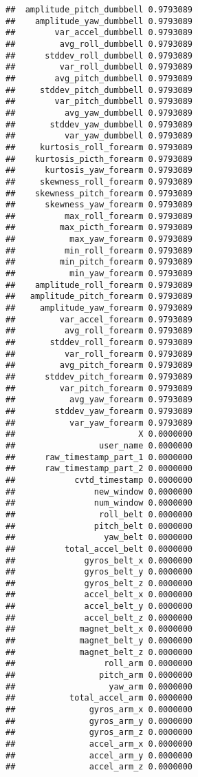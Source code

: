 \documentclass[]{article}
\begin{document}
\begin{verbatim}
##  amplitude_pitch_dumbbell 0.9793089
##    amplitude_yaw_dumbbell 0.9793089
##        var_accel_dumbbell 0.9793089
##         avg_roll_dumbbell 0.9793089
##      stddev_roll_dumbbell 0.9793089
##         var_roll_dumbbell 0.9793089
##        avg_pitch_dumbbell 0.9793089
##     stddev_pitch_dumbbell 0.9793089
##        var_pitch_dumbbell 0.9793089
##          avg_yaw_dumbbell 0.9793089
##       stddev_yaw_dumbbell 0.9793089
##          var_yaw_dumbbell 0.9793089
##     kurtosis_roll_forearm 0.9793089
##    kurtosis_picth_forearm 0.9793089
##      kurtosis_yaw_forearm 0.9793089
##     skewness_roll_forearm 0.9793089
##    skewness_pitch_forearm 0.9793089
##      skewness_yaw_forearm 0.9793089
##          max_roll_forearm 0.9793089
##         max_picth_forearm 0.9793089
##           max_yaw_forearm 0.9793089
##          min_roll_forearm 0.9793089
##         min_pitch_forearm 0.9793089
##           min_yaw_forearm 0.9793089
##    amplitude_roll_forearm 0.9793089
##   amplitude_pitch_forearm 0.9793089
##     amplitude_yaw_forearm 0.9793089
##         var_accel_forearm 0.9793089
##          avg_roll_forearm 0.9793089
##       stddev_roll_forearm 0.9793089
##          var_roll_forearm 0.9793089
##         avg_pitch_forearm 0.9793089
##      stddev_pitch_forearm 0.9793089
##         var_pitch_forearm 0.9793089
##           avg_yaw_forearm 0.9793089
##        stddev_yaw_forearm 0.9793089
##           var_yaw_forearm 0.9793089
##                         X 0.0000000
##                 user_name 0.0000000
##      raw_timestamp_part_1 0.0000000
##      raw_timestamp_part_2 0.0000000
##            cvtd_timestamp 0.0000000
##                new_window 0.0000000
##                num_window 0.0000000
##                 roll_belt 0.0000000
##                pitch_belt 0.0000000
##                  yaw_belt 0.0000000
##          total_accel_belt 0.0000000
##              gyros_belt_x 0.0000000
##              gyros_belt_y 0.0000000
##              gyros_belt_z 0.0000000
##              accel_belt_x 0.0000000
##              accel_belt_y 0.0000000
##              accel_belt_z 0.0000000
##             magnet_belt_x 0.0000000
##             magnet_belt_y 0.0000000
##             magnet_belt_z 0.0000000
##                  roll_arm 0.0000000
##                 pitch_arm 0.0000000
##                   yaw_arm 0.0000000
##           total_accel_arm 0.0000000
##               gyros_arm_x 0.0000000
##               gyros_arm_y 0.0000000
##               gyros_arm_z 0.0000000
##               accel_arm_x 0.0000000
##               accel_arm_y 0.0000000
##               accel_arm_z 0.0000000

\end{verbatim}
\end{document}
